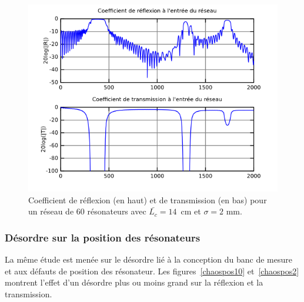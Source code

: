 \begin{figure}
	\centering
	\includegraphics[scale=0.7]{./images_chp1/chaos_2mm.png}
	\caption{\label{chaos2} Coefficient de réflexion (en haut) et de transmission (en bas) pour un réseau de 60 résonateurs avec $\bar{L_c}=14$~cm et $\sigma=2$ mm.}
\end{figure}

\subsubsection{Désordre sur la position des résonateurs}
La même étude est menée sur le désordre lié à la conception du banc de mesure et aux défauts de position des résonateur.
Les figures~\ref{chaospos10} et~\ref{chaospos2} montrent l'effet d'un désordre plus ou moins grand sur la réflexion et la transmission.


